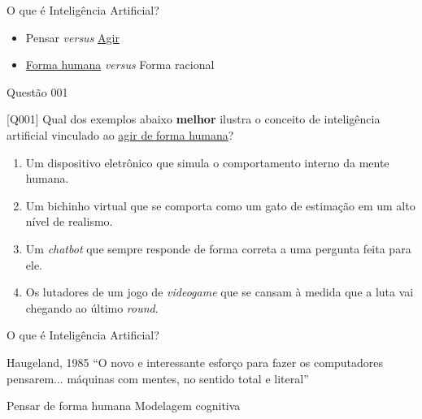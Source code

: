 \documentclass[xcolor=dvipsnames,table]{beamer}
\begin{document}
	\begin{frame}{O que é Inteligência Artificial?}
		\begin{itemize}
			\item Pensar {\it versus} \underline{Agir}
			 \item \underline{Forma humana} {\it versus} Forma racional %
		\end{itemize}
	\end{frame}        

        \begin{frame}{Questão 001}
		\begin{block}{[Q001]}
			Qual dos exemplos abaixo {\bf melhor} ilustra o conceito de inteligência artificial vinculado ao \underline{agir de forma humana}?
		\end{block}
		\begin{enumerate}[label=(\Alph*)]
		      \item Um dispositivo eletrônico que simula o comportamento interno da mente humana.
			\item Um bichinho virtual que se comporta como um gato de estimação em um alto nível de realismo.	
                \item Um {\it chatbot} que sempre responde de forma correta a uma pergunta feita para ele.
			\item Os lutadores de um jogo de {\it videogame} que se cansam à medida que a luta vai chegando ao último {\it round}.
			
		\end{enumerate}
	\end{frame}
	
	\begin{frame}{O que é Inteligência Artificial?}
		\begin{block}{Haugeland, 1985}
			``O novo e interessante esforço para fazer os computadores pensarem... máquinas com mentes, no sentido total e literal''
		\end{block} \pause
		\begin{exampleblock}{Pensar de forma humana}
			Modelagem cognitiva
		\end{exampleblock}
	\end{frame}
\end{document}
